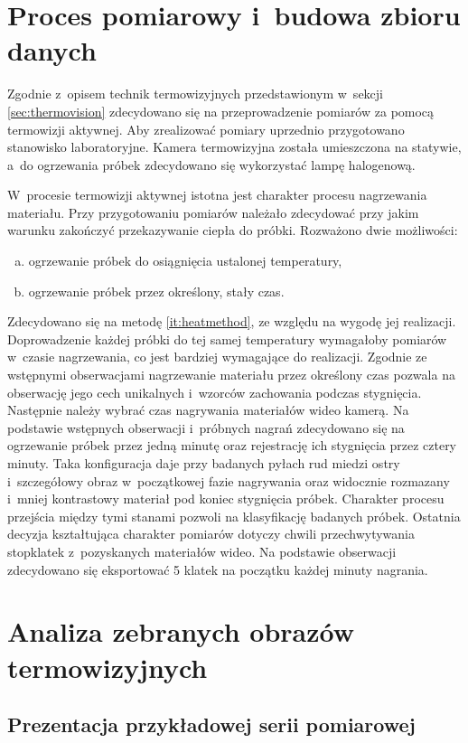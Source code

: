 \section{Proces pomiarowy i~budowa zbioru danych}
Zgodnie z~opisem technik termowizyjnych przedstawionym w~sekcji
\ref{sec:thermovision} zdecydowano się na przeprowadzenie pomiarów za pomocą
termowizji aktywnej.
Aby zrealizować pomiary uprzednio przygotowano stanowisko laboratoryjne.
Kamera termowizyjna została umieszczona na statywie, a~do ogrzewania próbek
zdecydowano się wykorzystać lampę halogenową.

W~procesie termowizji aktywnej istotna jest charakter procesu nagrzewania
materiału.
Przy przygotowaniu pomiarów należało zdecydować przy jakim warunku zakończyć
przekazywanie ciepła do próbki.
Rozważono dwie możliwości:
\begin{enumerate}[a)]
	\item ogrzewanie próbek do osiągnięcia ustalonej temperatury,
	\item \label{it:heatmethod} ogrzewanie próbek przez określony, stały czas.
\end{enumerate}
Zdecydowano się na metodę \ref{it:heatmethod}, ze względu na wygodę jej
realizacji.
Doprowadzenie każdej próbki do tej samej temperatury wymagałoby pomiarów
w~czasie nagrzewania, co jest bardziej wymagające do realizacji.
Zgodnie ze wstępnymi obserwacjami nagrzewanie materiału przez określony
czas pozwala na obserwację jego cech unikalnych i~wzorców zachowania podczas
stygnięcia.
Następnie należy wybrać czas nagrywania materiałów wideo kamerą.
Na podstawie wstępnych obserwacji i~próbnych nagrań zdecydowano się na
ogrzewanie próbek przez jedną minutę oraz rejestrację ich stygnięcia przez
cztery minuty.
Taka konfiguracja daje przy badanych pyłach rud miedzi ostry i~szczegółowy
obraz w~początkowej fazie nagrywania oraz widocznie rozmazany i~mniej
kontrastowy materiał pod koniec stygnięcia próbek.
Charakter procesu przejścia między tymi stanami pozwoli na klasyfikację
badanych próbek.
Ostatnia decyzja kształtująca charakter pomiarów dotyczy chwili
przechwytywania stopklatek z~pozyskanych materiałów wideo.
Na podstawie obserwacji zdecydowano się eksportować 5 klatek na początku
każdej minuty nagrania.

\section{Analiza zebranych obrazów termowizyjnych}

\subsection{Prezentacja przykładowej serii pomiarowej}

